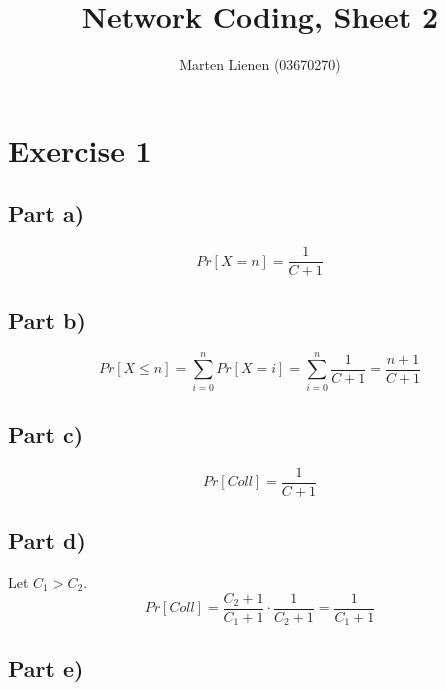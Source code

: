 \documentclass[10pt,a4paper]{article}
\title{Network Coding, Sheet 2}
\author{Marten Lienen (03670270)}
\begin{document}
\maketitle

\section*{Exercise 1}

\subsection*{Part a)}

\begin{equation*}
  Pr[X = n] = \frac{1}{C + 1}
\end{equation*}

\subsection*{Part b)}

\begin{equation*}
  Pr[X \le n] = \sum_{i = 0}^{n} Pr[X = i] = \sum_{i = 0}^{n} \frac{1}{C + 1} = \frac{n + 1}{C + 1}
\end{equation*}

\subsection*{Part c)}

\begin{equation*}
  Pr[Coll] = \frac{1}{C + 1}
\end{equation*}

\subsection*{Part d)}

Let $C_{1} > C_{2}$.
\begin{equation*}
  Pr[Coll] = \frac{C_{2} + 1}{C_{1} + 1} \cdot \frac{1}{C_{2} + 1} = \frac{1}{C_{1} + 1}
\end{equation*}

\subsection*{Part e)}
\end{document}
